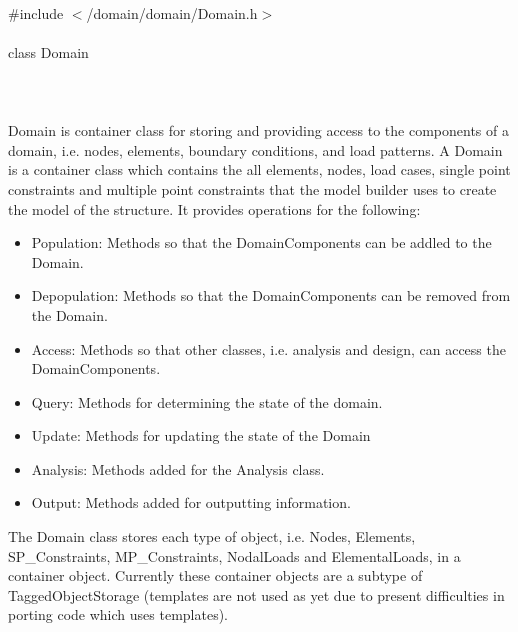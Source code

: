 
   \\
\indent \#include $<$/domain/domain/Domain.h$>$  \\

  \\
\indent class Domain  \\

 \\
 \\

  \\
\indent Domain is container class for storing and providing access to
the components of a domain, i.e. nodes, elements, boundary conditions,
and load patterns. 
A Domain is a container class which contains the  all elements,
nodes, load cases, single point constraints and multiple point
constraints that the model builder uses to create the model of the
structure. It provides operations for the following: 
\begin{itemize}
\item Population: Methods so that the DomainComponents can be addled
to the Domain. 
\item Depopulation: Methods so that the DomainComponents can be removed
from the Domain.
\item Access: Methods so that other classes, i.e. analysis and design,
can access the DomainComponents.
\item Query: Methods for determining the state of the domain.
\item Update: Methods for updating the state of the Domain
\item Analysis: Methods added for the Analysis class.
\item Output: Methods added for outputting information.
\end{itemize}
The Domain class stores each type of object, i.e. Nodes, Elements,
SP\_Constraints, MP\_Constraints, NodalLoads and ElementalLoads, in a
container object. Currently these container objects are a subtype of
TaggedObjectStorage (templates are not used as yet due to present
difficulties in porting code which uses templates). \\

